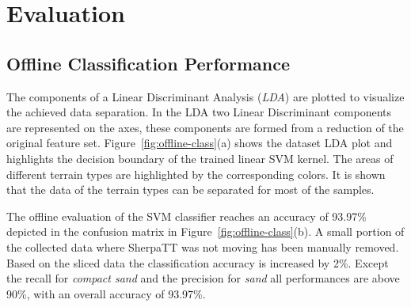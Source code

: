 \section{Evaluation}
\subsection{Offline Classification Performance}
The components of a Linear Discriminant Analysis (\emph{LDA}) are plotted to visualize the achieved data separation. 
In the LDA two Linear Discriminant components are represented on the axes, these components are formed from a reduction of the original feature set.
Figure~\ref{fig:offline-class}(a) shows the dataset LDA plot and highlights the decision boundary of the trained linear SVM kernel. 
The areas of different terrain types are highlighted by the corresponding colors. 
It is shown that the data of the terrain types can be separated for most of the samples.

The offline evaluation of the SVM classifier reaches an accuracy of 93.97\% depicted in the confusion matrix in Figure~\ref{fig:offline-class}(b). 
A small portion of the collected data where SherpaTT was not moving has been manually removed. 
Based on the sliced data the classification accuracy is increased by 2\%.
Except the recall for \emph{compact sand} and the precision for \emph{sand} all performances are above 90\%, with an overall accuracy of 93.97\%.

